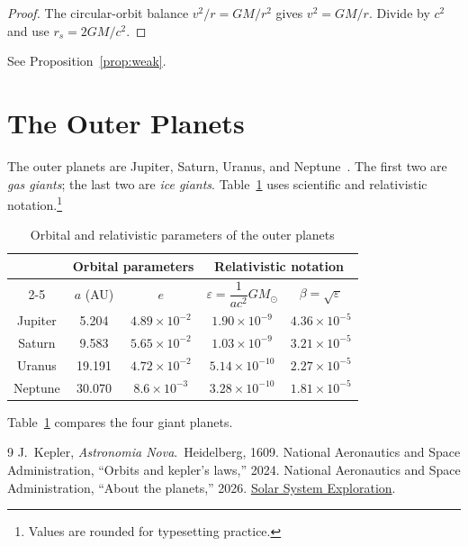 \documentclass[11pt]{article}
\begin{document}
\begin{proof}
The circular-orbit balance $v^2/r = GM/r^2$ gives $v^2 = GM/r$. Divide by $c^2$
and use $r_s = 2GM/c^2$.
\end{proof}

See Proposition~\ref{prop:weak}.

\section{The Outer Planets}
The outer planets are Jupiter, Saturn, Uranus, and Neptune~\cite{nasa_planets}.
The first two are \emph{gas giants}; the last two are \emph{ice giants}.
Table~\ref{tab:outer} uses scientific and relativistic notation.\footnote{Values
are rounded for typesetting practice.}

\begin{table}[ht]
    \centering
    \caption{Orbital and relativistic parameters of the outer planets}
    \label{tab:outer}
    \begin{tabular}{|c|c|c|c|c|}
        \hline
        \rowcolor{gray!15}
        \multirow{2}{*}{\textbf{Planet}}
            & \multicolumn{2}{c|}{\textbf{Orbital parameters}}
            & \multicolumn{2}{c|}{\textbf{Relativistic notation}} \\
        \cline{2-5}
        \rowcolor{gray!15}
            & $a$ (AU) & $e$ & $\varepsilon = \dfrac{1}{ac^2}GM_\odot$
            & $\beta = \sqrt{\varepsilon}$ \\
        \hline
        Jupiter & 5.204  & $4.89\times10^{-2}$ & $1.90\times10^{-9}$  & $4.36\times10^{-5}$ \\
        \hline
        Saturn  & 9.583  & $5.65\times10^{-2}$ & $1.03\times10^{-9}$  & $3.21\times10^{-5}$ \\
        \hline
        Uranus  & 19.191 & $4.72\times10^{-2}$ & $5.14\times10^{-10}$ & $2.27\times10^{-5}$ \\
        \hline
        Neptune & 30.070 & $8.6\times10^{-3}$  & $3.28\times10^{-10}$ & $1.81\times10^{-5}$ \\
        \hline
    \end{tabular}
\end{table}

Table~\ref{tab:outer} compares the four giant planets.

\begin{thebibliography}{9}
    J.~Kepler, \emph{Astronomia Nova}.\ Heidelberg, 1609.
    National Aeronautics and Space Administration, ``Orbits and kepler's laws,''
    2024.
    National Aeronautics and Space Administration, ``About the planets,'' 2026.
    \href{https://science.nasa.gov/solar-system/}{Solar System Exploration}.
\end{thebibliography}
\end{document}
